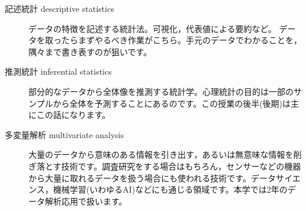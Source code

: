 \begin{description}
	\item[記述統計 descriptive statistics] データの特徴を記述する統計法。可視化，代表値による要約など。 データを取ったらまずやるべき作業がこちら。手元のデータでわかることを，隅々まで書き表すのが狙いです。
	\item[推測統計 inferential statistics] 部分的なデータから全体像を推測する統計学。心理統計の目的は一部のサンプルから全体を予測することにあるのです。この授業の後半(後期)は主にこの話になります。
	\item[多変量解析 multivariate analysis] 大量のデータから意味のある情報を引き出す，あるいは無意味な情報を削ぎ落とす技術です。調査研究をする場合はもちろん，センサーなどの機器から大量に取れるデータを扱う場合にも使われる技術です。データサイエンス，機械学習(いわゆるAI)などにも通じる領域です。本学では2年のデータ解析応用で扱います。
\end{description}
